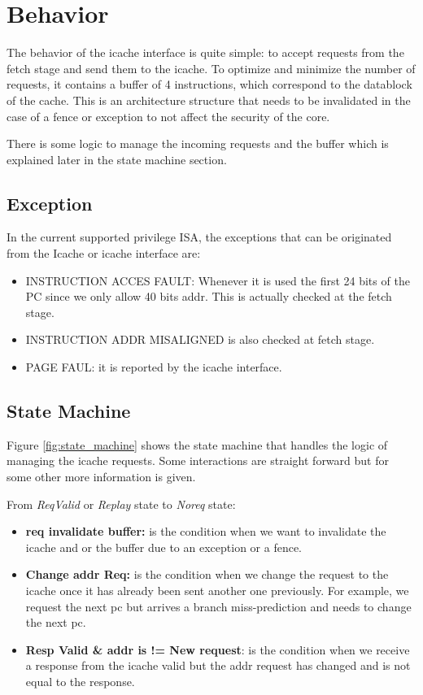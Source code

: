 \section{Behavior}
\label{behavior}

The behavior of the icache interface is quite simple: to accept requests from the fetch stage and send them to the icache. To optimize and minimize the number of requests, it contains a buffer of 4 instructions, which correspond to the datablock of the cache. This is an architecture structure that needs to be invalidated in the case of a fence or exception to not affect the security of the core. 

There is some logic to manage the incoming requests and the buffer which is explained later in the state machine section.

\subsection{Exception}
In the current supported privilege ISA, the exceptions that can be originated from the Icache or icache interface are:
\begin{itemize}
	\item INSTRUCTION ACCES FAULT: Whenever it is used the first 24 bits of the PC since we only allow 40 bits addr. This is actually checked at the fetch stage.
	\item INSTRUCTION ADDR MISALIGNED is also checked at fetch stage.
	\item PAGE FAUL: it is reported by the icache interface.
\end{itemize}

\subsection{State Machine}

Figure \ref{fig:state_machine} shows the state machine that handles the logic of managing the icache requests. Some interactions are straight forward but for some other more information is given.

From \emph{ReqValid} or \emph{Replay} state to \emph{Noreq} state:
\begin{itemize}
	\item \textbf{req invalidate buffer:} is the condition when we want to invalidate the icache and or the buffer due to an exception or a fence.
	\item \textbf{Change addr Req:} is the condition when we change the request to the icache once it has already been sent another one previously. For example, we request the next pc but arrives a branch miss-prediction and needs to change the next pc. 
	\item \textbf{Resp Valid \& addr is != New request}: is the condition when we receive a response from the icache valid but the addr request has changed and is not equal to the response.
\end{itemize}

